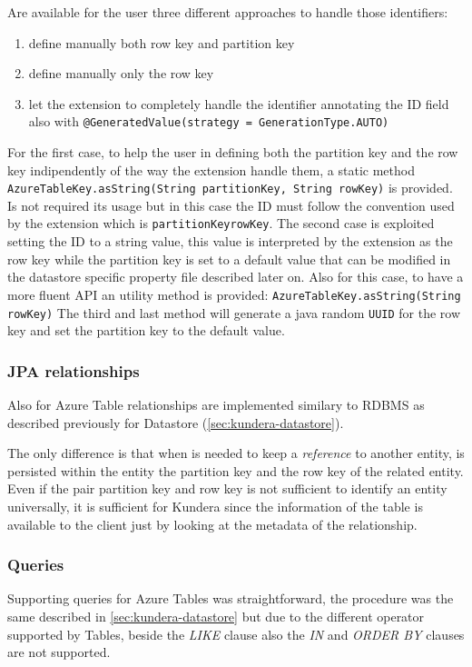 \newparagraph Are available for the user three different approaches to handle those identifiers:
\begin{enumerate}
\item define manually both row key and partition key
\item define manually only the row key 
\item let the extension to completely handle the identifier annotating the ID field also with \texttt{@GeneratedValue(strategy = GenerationType.AUTO)}
\end{enumerate}

\noindent For the first case, to help the user in defining both the partition key and the row key indipendently of the way the extension handle them, a static method \texttt{AzureTableKey.asString(String partitionKey, String rowKey)} is provided. Is not required its usage but in this case the ID must follow the convention used by the extension which is \texttt{partitionKey\textunderscore rowKey}.
\noindent The second case is exploited setting the ID to a string value, this value is interpreted by the extension as the row key while the partition key is set to a default value that can be modified in the datastore specific property file described later on. Also for this case, to have a more fluent API an utility method is provided: \texttt{AzureTableKey.asString(String rowKey)} 
\noindent The third and last method will generate a java random \texttt{UUID} for the row key and set the partition key to the default value.

\subsubsection{JPA relationships}
Also for Azure Table relationships are implemented similary to RDBMS as described previously for Datastore (\ref{sec:kundera-datastore}).

\noindent The only difference is that when is needed to keep a \textit{reference} to another entity, is persisted within the entity the partition key and the row key of the related entity.
Even if the pair partition key and row key is not sufficient to identify an entity universally, it is sufficient for Kundera since the information of the table is available to the client just by looking at the metadata of the relationship. 

\subsubsection{Queries}
Supporting queries for Azure Tables was straightforward, the procedure was the same described in \ref{sec:kundera-datastore} but due to the different operator supported by Tables, beside the \textit{LIKE} clause also the \textit{IN} and \textit{ORDER BY} clauses are not supported.

